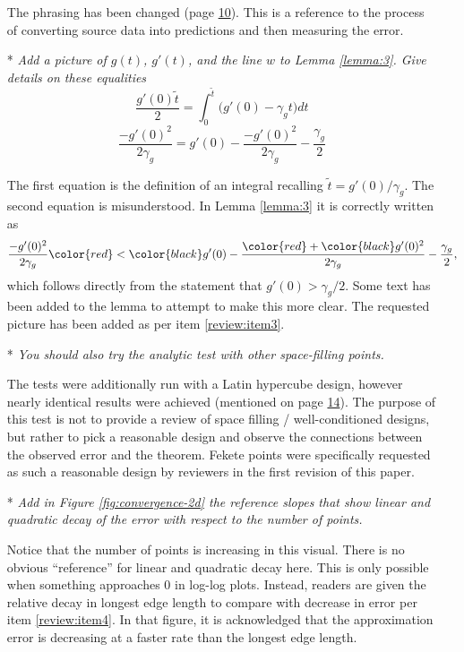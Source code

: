 \begin{itemize}[leftmargin=.5cm]
The phrasing has been changed (page \hyperlink{page.10}{10}). This is a reference to the process of converting source data into predictions and then measuring the error.

\newpage\setcounter{page}{0}\thispagestyle{empty}
\item[*] {\it Add a picture of $g(t)$, $g'(t)$, and the line $w$ to Lemma \ref{lemma:3}. Give details on these equalities}
  $$ \frac{g'(0) \tilde t}{2} = \int_0^{\tilde t} \bigl( g'(0) - \gamma_g t \bigr) dt$$
  $$ \frac{-g'(0)^2}{2 \gamma_g} = g'(0) - \frac{-g'(0)^2}{2 \gamma_g} - \frac{\gamma_g}{2}$$
\vspace{.2cm}

The first equation is the definition of an integral recalling $\tilde t = g'(0) / \gamma_g$. The second equation is misunderstood. In Lemma \ref{lemma:3} it is correctly written as
  $$ \frac{-g'(0)^2}{2 \gamma_g} \color{red}<\color{black} g'(0) - \frac{\color{red}+\color{black} g'(0)^2}{2 \gamma_g} - \frac{\gamma_g}{2},$$ \newline\noindent which follows directly from the statement that $g'(0) > \gamma_g / 2$. Some text has been added to the lemma to attempt to make this more clear. The requested picture has been added as per item \ref{review:item3}.

\item[*] {\it You should also try the analytic test with other space-filling points.}\vspace{.2cm}

The tests were additionally run with a Latin hypercube design, however nearly identical results were achieved (mentioned on page \hyperlink{page.14}{14}). The purpose of this test is not to provide a review of space filling / well-conditioned designs, but rather to pick a reasonable design and observe the connections between the observed error and the theorem. Fekete points were specifically requested as such a reasonable design by reviewers in the first revision of this paper.

\item[*] {\it Add in Figure \ref{fig:convergence-2d} the reference slopes that show linear and quadratic decay of the error with respect to the number of points.}\vspace{.2cm}

Notice that the number of points is increasing in this visual. There is no obvious ``reference'' for linear and quadratic decay here. This is only possible when something approaches 0 in log-log plots. Instead, readers are given the relative decay in longest edge length to compare with decrease in error per item \ref{review:item4}. In that figure, it is acknowledged that the approximation error is decreasing at a faster rate than the longest edge length.


\end{itemize}
